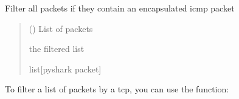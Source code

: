 \documentclass[letterpaper,10pt,english,openany,oneside]{sphinxmanual}
\begin{document}
\begin{fulllineitems}
\label{\detokenize{index:pktsniffer.filter_by_net}}
\pysigstartsignatures
\pysiglinewithargsret
{}
{\sphinxparamcomma {}}
{}
\pysigstopsignatures
\sphinxAtStartPar
Filter all packets if they contain an encapsulated icmp packet
\begin{quote}\begin{description}
\sphinxAtStartPar
{} (\sphinxstyleliteralemphasis{\sphinxupquote{{[}}}\sphinxstyleliteralemphasis{\sphinxupquote{{]}}}) \textendash{} List of packets

\sphinxAtStartPar
the filtered list

\sphinxAtStartPar
list{[}pyshark packet{]}

\end{description}\end{quote}

\end{fulllineitems}


\sphinxAtStartPar
To filter a list of packets by a tcp, you can
use the  function:
\end{document}
